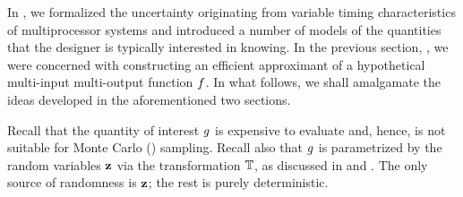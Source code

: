 In , we formalized the uncertainty originating from variable
timing characteristics of multiprocessor systems and introduced a number of
models of the quantities that the designer is typically interested in knowing.
In the previous section, , we were concerned with
constructing an efficient approximant of a hypothetical multi-input multi-output
function $f$. In what follows, we shall amalgamate the ideas developed in the
aforementioned two sections.

Recall that the quantity of interest $g$ is expensive to evaluate and, hence,
is not suitable for Monte Carlo () sampling. Recall also that $g$ is
parametrized by the random variables $\mathbf{z}$ via the transformation
$\mathbb{T}$, as discussed in  and
. The only source of randomness is $\mathbf{z}$; the rest is
purely deterministic.
